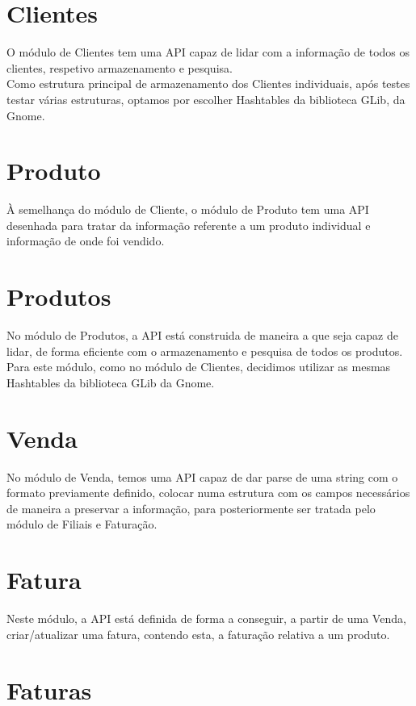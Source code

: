 \documentclass[a4paper]{report}
\begin{document}
\section{Clientes}

O módulo de Clientes tem uma API capaz de lidar com a informação de todos os
clientes, respetivo armazenamento e pesquisa. \\ 
Como estrutura principal de armazenamento dos Clientes individuais, após testes 
testar várias estruturas, optamos por escolher Hashtables da biblioteca GLib, 
da Gnome.

\section{Produto}

À semelhança do módulo de Cliente, o módulo de Produto tem uma API desenhada
para tratar da informação referente a um produto individual e informação de 
onde foi vendido.

\section{Produtos}

No módulo de Produtos, a API está construida de maneira a que seja capaz de
lidar, de forma eficiente com o armazenamento e pesquisa de todos os produtos.\\
Para este módulo, como no módulo de Clientes, decidimos utilizar as mesmas Hashtables
da biblioteca GLib da Gnome.

\section{Venda}

No módulo de Venda, temos uma API capaz de dar parse de uma string com o formato 
previamente definido, colocar numa estrutura com os campos necessários de maneira
a preservar a informação, para posteriormente ser tratada pelo módulo de Filiais e
Faturação.

\section{Fatura}

Neste módulo, a API está definida de forma a conseguir, a partir de uma Venda,
criar/atualizar uma fatura, contendo esta, a faturação relativa a um produto.

\section{Faturas}
\end{document}
